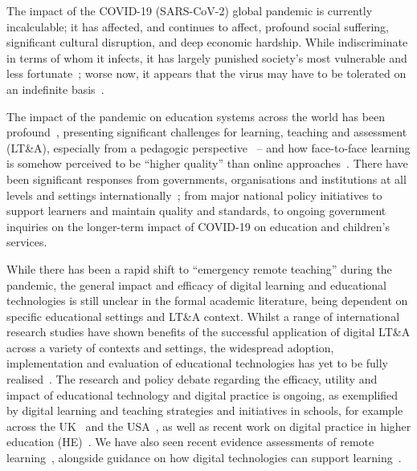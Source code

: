 \documentclass[conference]{IEEEtran}
\begin{document}
The impact of the COVID-19 (SARS-CoV-2) global pandemic is currently
incalculable; it has affected, and continues to affect, profound
social suffering, significant cultural disruption, and deep economic
hardship. While indiscriminate in terms of whom it infects, it has
largely punished society’s most vulnerable and less
fortunate~\cite{vonbraun-et-al:2020,lancetcovid:2020,vanlancker+parolin:2020};
worse now, it appears that the virus may have to be tolerated on an
indefinite basis~\cite{kissler-et-al:2020}.

The impact of the pandemic on education systems across the world has
been profound~\cite{unescocovidedu:2020,armitage+nellums:2020},
presenting significant challenges for learning, teaching and
assessment (LT\&A), especially from a pedagogic
perspective~\cite{doucet-et-al:2020,oecd:2020,aace:2020} -- and how
face-to-face learning is somehow perceived to be ``higher quality''
than online
approaches~\cite{paechter+maier:ihe2010,scbbcnews:2020}. There have
been significant responses from governments, organisations and
institutions at all levels and settings
internationally~\cite{who:2020}; from major national policy
initiatives to support learners and maintain quality and standards, to
ongoing government inquiries on the longer-term impact of COVID-19 on
education and children’s services.


While there has been a rapid shift to ``emergency remote teaching''
during the pandemic, the general impact and efficacy of digital
learning and educational technologies is still unclear in the formal
academic literature, being dependent on specific educational settings
and LT\&A context. Whilst a range of international research studies
have shown benefits of the successful application of digital LT\&A
across a variety of contexts and settings, the widespread adoption,
implementation and evaluation of educational technologies has yet to
be fully
realised~\cite{decodinglearning:2012,means:2014,ecjrc:2017,mayer:2018}.
The research and policy debate regarding the efficacy, utility and
impact of educational technology and digital practice is ongoing, as
exemplified by digital learning and teaching strategies and
initiatives in schools, for example across the
UK~\cite{digscot:2016,dfe:2019} and the USA~\cite{usdoe:2020}, as well
as recent work on digital practice in higher education
(HE)~\cite{jisc:2020,wef:2020}. We have also seen recent evidence
assessments of remote learning~\cite{eefremote:2020}, alongside
guidance on how digital technologies can support
learning~\cite{eefdigtech:2019}.
\end{document}
